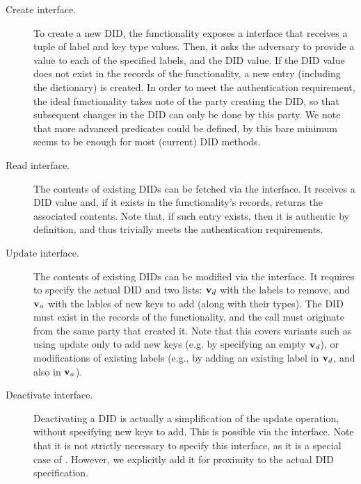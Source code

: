 \begin{description}
\item[Create interface.] To create a new DID, the functionality exposes a
   interface that receives a tuple of label and key type values.
  Then, it asks the adversary to provide a value to each of the specified
  labels, and the DID value. If the DID value does not exist in the records of
  the functionality, a new entry (including the dictionary) is created. In order
  to meet the authentication requirement, the ideal functionality takes note of
  the party creating the DID, so that subsequent changes in the DID can only be
  done by this party. We note that more advanced predicates could be defined, by
  this bare minimum seems to be enough for most (current) DID methods.
\item[Read interface.] The contents of existing DIDs can be fetched via the
   interface. It receives a DID value and, if it exists in the
  functionality's records, returns the associated contents. Note that, if such
  entry exists, then it is authentic by definition, and thus trivially meets
  the authentication requirements.
\item[Update interface.] The contents of existing DIDs can be modified via the
   interface. It requires to specify the actual DID and two lists:
  $\mathbf{v}_d$ with the labels to remove, and $\mathbf{v}_a$ with the lables of new keys
  to add (along with their types). The DID must exist in the records of the
  functionality, and the call must originate from the same party that created
  it. Note that this covers variants such as using update only to add new keys
  (e.g. by specifying an empty $\mathbf{v}_d$), or modifications of existing labels
  (e.g., by adding an existing label in $\mathbf{v}_d$, and also in $\mathbf{v}_a$).
\item[Deactivate interface.] Deactivating a DID is actually a simplification of
  the update operation, without specifying new keys to add. This is possible
  via the  interface. Note that it is not strictly necessary to
  specify this interface, as it is a special case of . However, we
  explicitly add it for proximity to the actual DID specification. 
\end{description}


